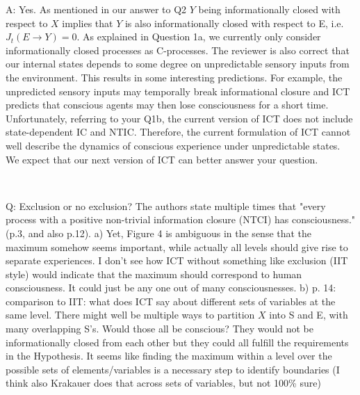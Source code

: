 \documentclass[utf8]{article}
\newcounter{cQuestion}[section]
\newenvironment{question}
    {\refstepcounter{cQuestion}\color{Blue}\noindent\newline Q\thecQuestion:}
    {~\newline}
\newenvironment{ans}  
    {\color{Black}\noindent A:}
    {~\newline}
\begin{document}
        \begin{ans}
            Yes. As mentioned in our answer to Q2 $Y$ being informationally closed with respect to $X$ implies that $Y$ is also informationally closed with respect to E, i.e. $J_t(E\rightarrow Y) = 0$.
            As explained in Question 1a, we currently only consider informationally closed processes as C-processes. The reviewer is also correct that our internal states depends to some degree on unpredictable sensory inputs from the environment. This results in some interesting predictions. For example, the unpredicted sensory inputs may temporally break informational closure and ICT predicts that conscious agents may then lose consciousness for a short time. Unfortunately, referring to your Q1b, the current version of ICT does not include state-dependent IC and NTIC. Therefore, the current formulation of ICT cannot well describe the dynamics of conscious experience under unpredictable states. We expect that our next version of ICT can better answer your question. 
            
        \end{ans}
        

        \begin{question}
            Exclusion or no exclusion? The authors state multiple times that "every process with a positive non-trivial information closure (NTCI) has consciousness." (p.3, and also p.12).
            a) Yet, Figure 4 is ambiguous in the sense that the maximum somehow seems important, while actually all levels should give rise to separate experiences. I don't see how ICT without something like exclusion (IIT style) would indicate that the maximum should correspond to human consciousness. It could just be any one out of many consciousnesses.
            b) p. 14: comparison to IIT: what does ICT say about different sets of variables at the same level. There might well be multiple ways to partition $X$ into S and E, with many overlapping S's. Would those all be conscious? They would not be informationally closed from each other but they could all fulfill the requirements in the Hypothesis. It seems like finding the maximum within a level over the possible sets of elements/variables is a necessary step to identify boundaries (I think also Krakauer does that across sets of variables, but not 100\% sure)        
        \end{question}
    
\end{document}
